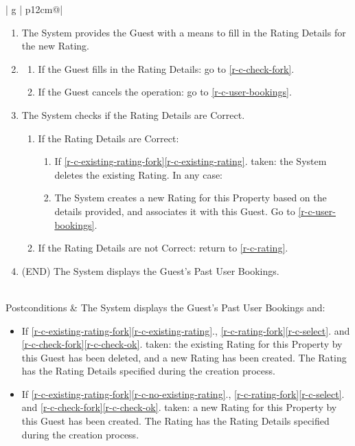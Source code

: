 \begin{table}[H]
\begin{tabular}{| g | p{12cm}@\qquad |}
\begin{enumerate}
            \item \label{r-c-rating} The System provides the Guest with a means to fill in the Rating Details for the new Rating.
            \item \label{r-c-rating-fork}
            \begin{enumerate}
                \item \label{r-c-select} If the Guest fills in the Rating Details: go to \ref{r-c-check-fork}.
                \item \label{r-c-cancel} If the Guest cancels the operation: go to \ref{r-c-user-bookings}.
            \end{enumerate}
            \item \label{r-c-check-fork} The System checks if the Rating Details are Correct.
            \begin{enumerate}
                \item \label{r-c-check-ok} If the Rating Details are Correct:
                \begin{enumerate}
                    \item If \ref{r-c-existing-rating-fork}\ref{r-c-existing-rating}. taken: the System deletes the existing Rating. In any case:
                    \item \label{r-c-give-rating}The System creates a new Rating for this Property based on the details provided, and associates it with this Guest. Go to \ref{r-c-user-bookings}.
                \end{enumerate}
                \item If the Rating Details are not Correct: return to \ref{r-c-rating}.
            \end{enumerate}
            \item \label{r-c-user-bookings} (END) The System displays the Guest's Past User Bookings.
        \end{enumerate}
        \\ \hline
        Postconditions &
        The System displays the Guest's Past User Bookings and:
        \begin{itemize}
            \item If \ref{r-c-existing-rating-fork}\ref{r-c-existing-rating}., \ref{r-c-rating-fork}\ref{r-c-select}. and \ref{r-c-check-fork}\ref{r-c-check-ok}. taken: the existing Rating for this Property by this Guest has been deleted, and a new Rating has been created. The Rating has the Rating Details specified during the creation process. 
            \item If \ref{r-c-existing-rating-fork}\ref{r-c-no-existing-rating}., \ref{r-c-rating-fork}\ref{r-c-select}. and \ref{r-c-check-fork}\ref{r-c-check-ok}. taken: a new Rating for this Property by this Guest has been created. The Rating has the Rating Details specified during the creation process.
        \end{itemize}
         \\ \hline
    \end{tabular}
    \caption{Use Case R-C: Give Rating}
    \label{use_case_r-c}
  \end{table}

